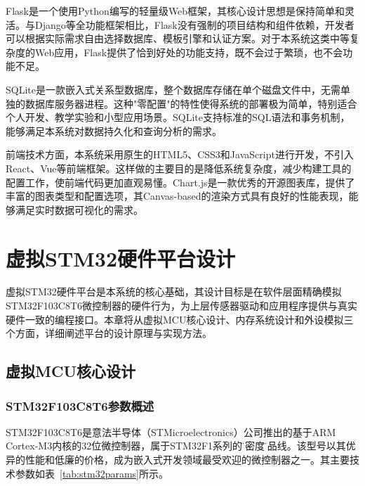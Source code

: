 \documentclass[12pt,a4paper]{ctexart}
\begin{document}
Flask是一个使用Python编写的轻量级Web框架，其核心设计思想是保持简单和灵活。与Django等全功能框架相比，Flask没有强制的项目结构和组件依赖，开发者可以根据实际需求自由选择数据库、模板引擎和认证方案。对于本系统这类中等复杂度的Web应用，Flask提供了恰到好处的功能支持，既不会过于繁琐，也不会功能不足。

SQLite是一款嵌入式关系型数据库，整个数据库存储在单个磁盘文件中，无需单独的数据库服务器进程。这种"零配置"的特性使得系统的部署极为简单，特别适合个人开发、教学实验和小型应用场景。SQLite支持标准的SQL语法和事务机制，能够满足本系统对数据持久化和查询分析的需求。

前端技术方面，本系统采用原生的HTML5、CSS3和JavaScript进行开发，不引入React、Vue等前端框架。这样做的主要目的是降低系统复杂度，减少构建工具的配置工作，使前端代码更加直观易懂。Chart.js是一款优秀的开源图表库，提供了丰富的图表类型和配置选项，其Canvas-based的渲染方式具有良好的性能表现，能够满足实时数据可视化的需求。



\section{虚拟STM32硬件平台设计}

虚拟STM32硬件平台是本系统的核心基础，其设计目标是在软件层面精确模拟STM32F103C8T6微控制器的硬件行为，为上层传感器驱动和应用程序提供与真实硬件一致的编程接口。本章将从虚拟MCU核心设计、内存系统设计和外设模拟三个方面，详细阐述平台的设计原理与实现方法。

\subsection{虚拟MCU核心设计}

\subsubsection{STM32F103C8T6参数概述}

STM32F103C8T6是意法半导体（STMicroelectronics）公司推出的基于ARM Cortex-M3内核的32位微控制器，属于STM32F1系列的\"中密度\"产品线。该型号以其优异的性能和低廉的价格，成为嵌入式开发领域最受欢迎的微控制器之一。其主要技术参数如表~\ref{tab:stm32params}所示。
\end{document}
